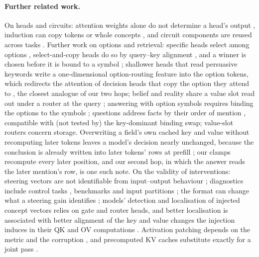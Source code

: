 \paragraph{Further related work.}
On heads and circuits: attention weights alone do not determine a head's output \citep{kobayashi2020norm}, induction can copy tokens or whole concepts \citep{feucht2025dualroute}, and circuit components are reused across tasks \citep{merullo2024reuse}. Further work on options and retrieval: specific heads select among options \citep{lieberum2023chinchilla,wiegreffe2025answer}, select-and-copy heads do so by query--key alignment \citep{tulchinskii2024wise}, and a winner is chosen before it is bound to a symbol \citep{wong2026decide}; shallower heads that read persuasive keywords write a one-dimensional option-routing feature into the option tokens, which redirects the attention of decision heads that copy the option they attend to \citep{sun2026persuaded}, the closest analogue of our two hops; belief and reality share a value slot read out under a router at the query \citep{steele2026routing}; answering with option symbols requires binding the options to the symbols \citep{robinson2023mcsb}; questions address facts by their order of mention \citep{zhou2026ordinal}, compatible with (not tested by) the key-dominant binding swap; value-slot routers \citep{steele2026spaces} concern storage. Overwriting a field's own cached key and value without recomputing later tokens leaves a model's decision nearly unchanged, because the conclusion is already written into later tokens' rows at prefill \citep{bojieli2026notes}; our clamps recompute every later position, and our second hop, in which the answer reads the later mention's row, is one such note. On the validity of interventions: steering vectors are not identifiable from input--output behaviour \citep{venkatesh2026steering}; diagnostics include control tasks \citep{hewitt2019control}, benchmarks \citep{huang2024ravel,arora2024causalgym} and input partitions \citep{li2026bucketing}; the format can change what a steering gain identifies \citep{gao2026encodings}; models' detection and localisation of injected concept vectors relies on gate and router heads, and better localisation is associated with better alignment of the key and value changes the injection induces in their QK and OV computations \citep{zou2026introspection}. Activation patching \citep{vig2020causal} depends on the metric and the corruption \citep{zhang2023patching,heimersheim2024patching}, and precomputed KV caches substitute exactly for a joint pass \citep{pustovit2026packs}.
